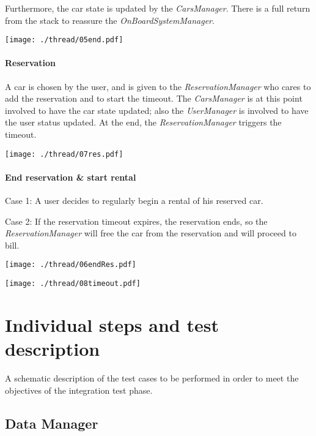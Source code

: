 \documentclass{scrreprt}
\begin{document}
Furthermore, the car state is updated by the \emph{CarsManager}. There is a full return from the stack to reassure the \emph{OnBoardSystemManager}.

\begin{center}
		\texttt{[image: ./thread/05end.pdf]}
\end{center}

\subsubsection{Reservation}
A car is chosen by the user, and is given to the \emph{ReservationManager} who cares to add the reservation and to start the timeout. The \emph{CarsManager} is at this point involved to have the car state updated; also the \emph{UserManager} is involved to have the user status updated. At the end, the \emph{ReservationManager} triggers the timeout.

\begin{center}
		\texttt{[image: ./thread/07res.pdf]}
\end{center}

\subsubsection{End reservation \& start rental}
Case 1: A user decides to regularly begin a rental of his reserved car.

Case 2: If the reservation timeout expires, the reservation ends, so the \emph{ReservationManager} will free the car from the reservation and will proceed to bill. 

\begin{center}
		\texttt{[image: ./thread/06endRes.pdf]}
\end{center}
\begin{center}
		\texttt{[image: ./thread/08timeout.pdf]}
\end{center}

\chapter{Individual steps and test description}
A schematic description of the test cases to be performed in order to meet the objectives of the integration test phase.

\section{Data Manager}
\end{document}
